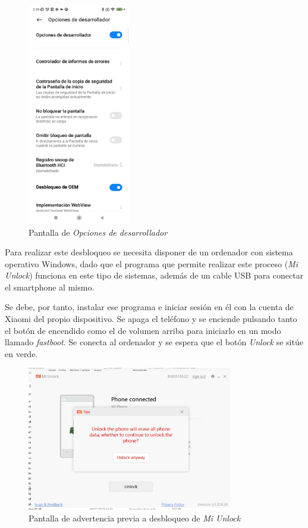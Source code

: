 \documentclass[12pt,a4paper,onecolumn,oneside]{report}
\begin{document}
\begin{figure}[h] 
\centering
  \includegraphics[width=0.4\textwidth]{figuras/root2.png}
  \caption[Pantalla de \textit{Opciones de desarrollador}]{Pantalla de \textit{Opciones de desarrollador}\\
  }
  \label{fig:root2}
\end{figure}

Para realizar este desbloqueo se necesita disponer de un ordenador con sistema operativo Windows, dado que el programa que permite realizar este proceso (\textit{Mi Unlock}) funciona en este tipo de sistemas, además de un cable USB para conectar el smartphone al mismo.

Se debe, por tanto, instalar ese programa e iniciar sesión en él con la cuenta de Xiaomi del propio dispositivo. Se apaga el teléfono y se enciende pulsando tanto el botón de encendido como el de volumen arriba para iniciarlo en un modo llamado \textit{fastboot}. Se conecta al ordenador y se espera que el botón \textit{Unlock} se sitúe en verde.

\begin{figure}[h] 
\centering
  \includegraphics[width=0.8\textwidth]{figuras/root3.png}
  \caption[Pantalla de advertencia previa a desbloqueo de \textit{Mi Unlock}]{Pantalla de advertencia previa a desbloqueo de \textit{Mi Unlock}\\
  }
  \label{fig:root3}
\end{figure}
\end{document}

